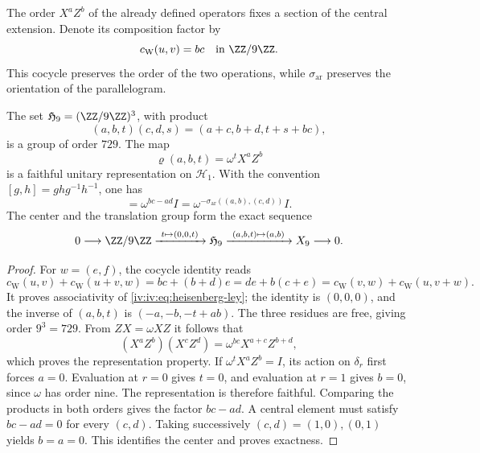 The order \(X^aZ^b\) of the already defined operators fixes a section
of the central extension. Denote its composition factor by
\begin{equation}
 c_{\mathrm W}(u,v)=bc\quad\text{in }\ZZ/9\ZZ.
 \label{iv:iv:eq:weyl-cociclo-polarizado}
\end{equation}
This cocycle preserves the order of the two operations, while
\(\sigma_{\mathrm{ar}}\) preserves the orientation of the parallelogram.

\begin{proposition}
\label{iv:iv:prop:heisenberg-orientado}
The set \(\mathfrak H_9=(\ZZ/9\ZZ)^3\), with product
\begin{equation}
 (a,b,t)(c,d,s)=(a+c,b+d,t+s+bc),
 \label{iv:iv:eq:heisenberg-ley}
\end{equation}
is a group of order \(729\). The map
\[
 \varrho(a,b,t)=\omega^tX^aZ^b
\]
is a faithful unitary representation on \(\mathcal H_1\).
With the convention \([g,h]=ghg^{-1}h^{-1}\), one has
\begin{equation}
 [\varrho(a,b,0),\varrho(c,d,0)]
 =\omega^{bc-ad}I
 =\omega^{-\sigma_{\mathrm{ar}}((a,b),(c,d))}I.
 \label{iv:iv:eq:weyl-conmutador-orientado}
\end{equation}
The center and the translation group form the exact sequence
\[
 0\longrightarrow\ZZ/9\ZZ
 \xrightarrow{\ t\mapsto(0,0,t)\ }\mathfrak H_9
 \xrightarrow{\ (a,b,t)\mapsto(a,b)\ }X_9
 \longrightarrow0.
\]
\end{proposition}
\begin{proof}
For \(w=(e,f)\), the cocycle identity reads
\[
 c_{\mathrm W}(u,v)+c_{\mathrm W}(u+v,w)
 =bc+(b+d)e
 =de+b(c+e)
 =c_{\mathrm W}(v,w)+c_{\mathrm W}(u,v+w).
\]
It proves associativity of \eqref{iv:iv:eq:heisenberg-ley}; the identity
is \((0,0,0)\), and the inverse of \((a,b,t)\) is
\((-a,-b,-t+ab)\). The three residues are free, giving order
\(9^3=729\). From \(ZX=\omega XZ\) it follows that
\[
 (X^aZ^b)(X^cZ^d)=\omega^{bc}X^{a+c}Z^{b+d},
\]
which proves the representation property. If
\(\omega^tX^aZ^b=I\), its action on \(\delta_r\) first forces
\(a=0\). Evaluation at \(r=0\) gives \(t=0\), and
evaluation at \(r=1\) gives \(b=0\), since \(\omega\) has order
nine. The representation is therefore faithful. Comparing the
products in both orders gives the factor \(bc-ad\).
A central element must satisfy \(bc-ad=0\) for every \((c,d)\).
Taking successively \((c,d)=(1,0),(0,1)\) yields
\(b=a=0\). This identifies the center and proves exactness.
\end{proof}

